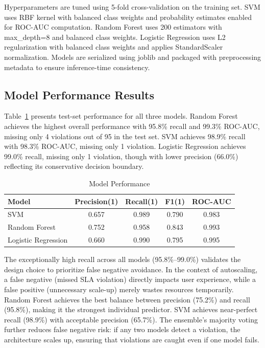 \documentclass[conference]{IEEEtran}
\begin{document}
Hyperparameters are tuned using 5-fold cross-validation on the training set. SVM uses RBF kernel with balanced class weights and probability estimates enabled for ROC-AUC computation. Random Forest uses 200 estimators with max\_depth=8 and balanced class weights. Logistic Regression uses L2 regularization with balanced class weights and applies StandardScaler normalization. Models are serialized using joblib and packaged with preprocessing metadata to ensure inference-time consistency.

\subsection{Model Performance Results}

Table~\ref{tab:gke-results} presents test-set performance for all three models. Random Forest achieves the highest overall performance with 95.8\% recall and 99.3\% ROC-AUC, missing only 4 violations out of 95 in the test set. SVM achieves 98.9\% recall with 98.3\% ROC-AUC, missing only 1 violation. Logistic Regression achieves 99.0\% recall, missing only 1 violation, though with lower precision (66.0\%) reflecting its conservative decision boundary.

\begin{table}[htbp]
\caption{Model Performance}
\begin{center}
\begin{tabular}{|l|c|c|c|c|}
\hline
\textbf{Model} & \textbf{Precision(1)} & \textbf{Recall(1)} & \textbf{F1(1)} & \textbf{ROC-AUC} \\
\hline
SVM & 0.657 & 0.989 & 0.790 & 0.983 \\
Random Forest & 0.752 & 0.958 & 0.843 & 0.993 \\
Logistic Regression & 0.660 & 0.990 & 0.795 & 0.995 \\
\hline
\end{tabular}
\label{tab:gke-results}
\end{center}
\end{table}

The exceptionally high recall across all models (95.8\%--99.0\%) validates the design choice to prioritize false negative avoidance. In the context of autoscaling, a false negative (missed SLA violation) directly impacts user experience, while a false positive (unnecessary scale-up) merely wastes resources temporarily. Random Forest achieves the best balance between precision (75.2\%) and recall (95.8\%), making it the strongest individual predictor. SVM achieves near-perfect recall (98.9\%) with acceptable precision (65.7\%). The ensemble's majority voting further reduces false negative risk: if any two models detect a violation, the architecture scales up, ensuring that violations are caught even if one model fails.
\end{document}
